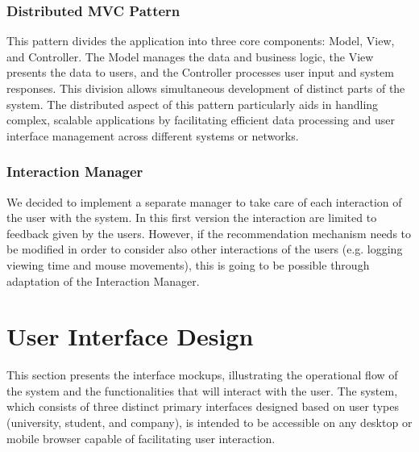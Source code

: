 \documentclass[a4paper,12pt]{article}
\begin{document}
\subsubsection{Distributed MVC Pattern}
This pattern divides the application into three
core components: Model, View, and Controller. The Model manages the data and business
logic, the View presents the data to users, and the Controller processes user input and system responses. This division allows simultaneous development of distinct parts of the system. The
distributed aspect of this pattern particularly aids in handling complex, scalable applications
by facilitating efficient data processing and user interface management across different systems
or networks.
\subsubsection{Interaction Manager}
We decided to implement a separate manager to take care of each interaction of the user with the system. In this first version the interaction are limited to feedback given by the users. However, if the recommendation mechanism needs to be modified in order to consider also other interactions of the users (e.g. logging viewing time and mouse movements), this is going to be possible through adaptation of the Interaction Manager.
\newpage

\section{User Interface Design}
This section presents the interface mockups, illustrating the operational flow of the system and the functionalities that will interact with the user. The system, which consists of three distinct primary interfaces designed based on user types (university, student, and company), is intended to be accessible on any desktop or mobile browser capable of facilitating user interaction.
\end{document}
